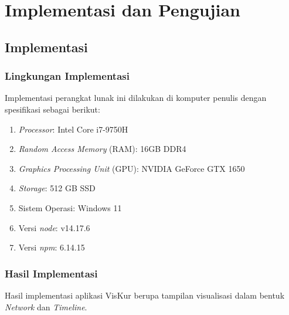 \chapter{Implementasi dan Pengujian}
\label{chap:implementasi}

\section{Implementasi}

\subsection{Lingkungan Implementasi}
Implementasi perangkat lunak ini dilakukan di komputer penulis dengan spesifikasi sebagai berikut:

\begin{enumerate}
    \item \textit{Processor}: Intel Core i7-9750H
    \item \textit{Random Access Memory} (RAM): 16GB DDR4
    \item \textit{Graphics Processing Unit} (GPU): NVIDIA GeForce GTX 1650
    \item \textit{Storage}: 512 GB SSD
    \item Sistem Operasi: Windows 11 
    \item Versi \textit{node}: v14.17.6
    \item Versi \textit{npm}: 6.14.15
\end{enumerate}

\subsection{Hasil Implementasi}
Hasil implementasi aplikasi VisKur berupa tampilan visualisasi dalam bentuk \textit{Network} dan \textit{Timeline}. 

